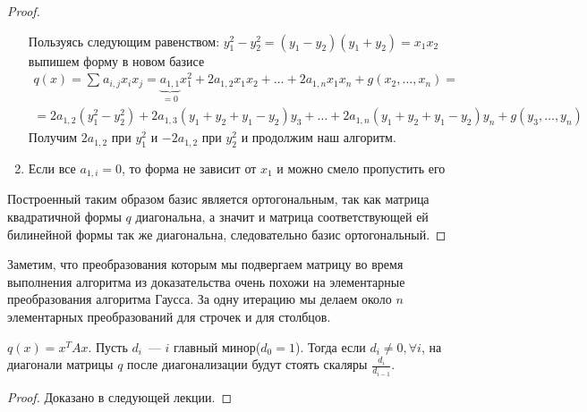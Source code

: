 \begin{proof}
\begin{enumerate}
            Пользуясь следующим равенством:
            $y_1^2 - y_2^2 = (y_1 - y_2)(y_1 + y_2) = x_1x_2$
            выпишем форму в новом базисе
            \[
                \begin{gathered}
                q(x) = \sum\limits_{}^{}{a_{i,j} x_i x_j} =
                \underbrace{a_{1,1}}_{=0}x_1^2 + 2a_{1,2}x_1x_2 + \dots + 2a_{1,n}x_1x_n + g(x_2,\dots, x_n)=\\
                =2a_{1,2}(y_1^2 - y_2^2) + 2a_{1,3}(y_1 + y_2 + y_1 - y_2)y_3 + \dots + 
                2a_{1,n}(y_1 + y_2 + y_1 - y_2)y_n + g(y_3,\dots, y_n)
                \end{gathered}
            \] 
            Получим $2a_{1,2}$ при $y_1^2$ и $-2a_{1,2}$ при $y_2^2$ и продолжим наш алгоритм.
        \item Если все $a_{1,i} = 0$, то форма не зависит от $x_1$ и можно смело пропустить его
    \end{enumerate}

    Построенный таким образом базис является ортогональным, так как матрица квадратичной
    формы $q$ диагональна, а значит и матрица соответствующей ей билинейной формы так же
    диагональна, следовательно базис ортогональный.
\end{proof}

Заметим, что преобразования которым мы подвергаем матрицу во время выполнения 
алгоритма из доказательства очень похожи на элементарные преобразования
алгоритма Гаусса. За одну итерацию мы делаем около $n$ элементарных
преобразований для строчек и для столбцов.

\begin{theorem}
    $q(x) = x^T Ax$. Пусть $d_i$~--- $i$ главный минор($d_0=1$).
    Тогда если $d_i \not= 0,\forall i$, на диагонали матрицы $q$ после диагонализации
    будут стоять скаляры $\frac{d_i}{d_{i - 1}}$.
\end{theorem}
\begin{proof}
    Доказано в следующей лекции.
\end{proof}
